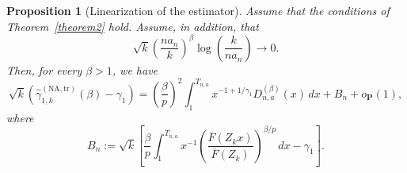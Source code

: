 \documentclass[reqno,openbib,runningheads,a4paper,12pt]{amsart}%
\newtheorem{proposition}{Proposition}[section]
\begin{document}
\begin{proposition}
[Linearization of the estimator]\label{prop:linearization} Assume that the
conditions of Theorem~\ref{theorem2} hold. Assume, in addition, that
\[
\sqrt{k} \left(  \frac{na_{n}}{k}\right)  ^{\beta} \log\!\left(  \frac
{k}{na_{n}}\right)  \to0.
\]
Then, for every $\beta>1$, we have
\[
\sqrt{k}\left(  \widehat{\gamma}_{1,k}^{(\mathrm{NA,tr})}(\beta) - \gamma_{1}
\right)  = \left(  \frac{\beta}{p}\right)  ^{2} \int_{1}^{T_{n,a}}
x^{-1+1/\gamma_{1}} D_{n,a}^{(\beta)}(x)\,dx + B_{n} + o_{\mathbf{P}}(1),
\]
where
\[
B_{n} := \sqrt{k} \left[  \frac{\beta}{p} \int_{1}^{T_{n,a}} x^{-1} \left(
\frac{\overline{F}(Z_{k}x)}{\overline{F}(Z_{k})} \right)  ^{\beta/p} \,dx -
\gamma_{1} \right]  .
\]

\end{proposition}
\end{document}
